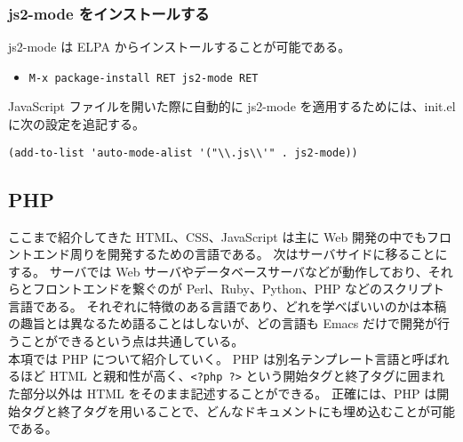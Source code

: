 \subsubsection{js2-mode をインストールする}
js2-mode は ELPA からインストールすることが可能である。
\begin{itemize}\setlength{\leftskip}{-1.00zw}%
\item[] \texttt{M-x package-install RET js2-mode RET}
\end{itemize}
JavaScript ファイルを開いた際に自動的に js2-mode を適用するためには、init.el に次の設定を追記する。
\begin{mdframed}[roundcorner=0.50zw,leftmargin=3.00zw,rightmargin=3.00zw,skipabove=0.40zw,skipbelow=0.40zw,innertopmargin=4.00pt,innerbottommargin=4.00pt,innerleftmargin=5.00pt,innerrightmargin=5.00pt,linecolor=gray!020,linewidth=0.50pt,backgroundcolor=gray!20]
\begin{verbatim}
(add-to-list 'auto-mode-alist '("\\.js\\'" . js2-mode))
\end{verbatim}
\end{mdframed}
\subsection{PHP}
ここまで紹介してきた HTML、CSS、JavaScript は主に Web 開発の中でもフロントエンド周りを開発するための言語である。
次はサーバサイドに移ることにする。
サーバでは Web サーバやデータベースサーバなどが動作しており、それらとフロントエンドを繋ぐのが Perl、Ruby、Python、PHP などのスクリプト言語である。
それぞれに特徴のある言語であり、どれを学べばいいのかは本稿の趣旨とは異なるため語ることはしないが、どの言語も Emacs だけで開発が行うことができるという点は共通している。\\

本項では PHP について紹介していく。
PHP は別名テンプレート言語と呼ばれるほど HTML と親和性が高く、\verb|<?php ?>| という開始タグと終了タグに囲まれた部分以外は HTML をそのまま記述することができる。
正確には、PHP は開始タグと終了タグを用いることで、どんなドキュメントにも埋め込むことが可能である。

